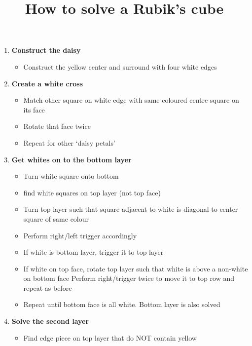 \documentclass{article}
\title{How to solve a Rubik's cube}
\author{}
\date{}
\begin{document}
    \maketitle
    \begin{enumerate}
        \item \textbf{Construct the daisy}
              \begin{itemize}
                  \item Construct the yellow center and surround with four white edges
              \end{itemize}
        \item \textbf{Create a white cross}
              \begin{itemize}
                  \item Match other square on white edge with same coloured centre square on its face
                  \item Rotate that face twice
                  \item Repeat for other `daisy petals'
              \end{itemize}
        \item \textbf{Get whites on to the bottom layer}
              \begin{itemize}
                  \item Turn white square onto bottom
                  \item find white squares on top layer (not top face)
                  \item Turn top layer such that square adjacent to white is diagonal to center square of same colour
                  \item Perform right/left trigger accordingly
                  \item If white is bottom layer, trigger it to top layer
                  \item If white on top face, rotate top layer such that white is above a non-white on bottom face
                        Perform right/trigger twice to move it to top row and repeat as before
                  \item Repeat until bottom face is all white. Bottom layer is also solved
              \end{itemize}
        \item \textbf{Solve the second layer}
              \begin{itemize}
                  \item Find edge piece on top layer that do NOT contain yellow

\end{itemize}
\end{enumerate}
\end{document}
